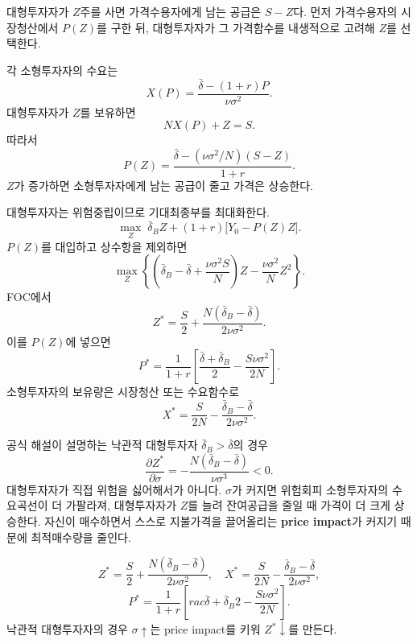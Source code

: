 \begin{strategybox}
대형투자자가 $Z$주를 사면 가격수용자에게 남는 공급은 $S-Z$다. 먼저 가격수용자의 시장청산에서 $P(Z)$를 구한 뒤, 대형투자자가 그 가격함수를 내생적으로 고려해 $Z$를 선택한다.
\end{strategybox}

\begin{solutionbox}
각 소형투자자의 수요는
\[
X(P)=\frac{\bar\delta-(1+r)P}{\nu\sigma^2}.
\]
대형투자자가 $Z$를 보유하면
\[
NX(P)+Z=S.
\]
따라서
\[
\boxed{P(Z)=\frac{\bar\delta-(\nu\sigma^2/N)(S-Z)}{1+r}}.
\]
$Z$가 증가하면 소형투자자에게 남는 공급이 줄고 가격은 상승한다.

대형투자자는 위험중립이므로 기대최종부를 최대화한다.
\[
\max_Z\;\bar\delta_B Z+(1+r)\bigl[Y_0-P(Z)Z\bigr].
\]
$P(Z)$를 대입하고 상수항을 제외하면
\[
\max_Z\left\{
\left(\bar\delta_B-\bar\delta+\frac{\nu\sigma^2S}{N}\right)Z
-\frac{\nu\sigma^2}{N}Z^2
\right\}.
\]
FOC에서
\[
\boxed{Z^*=\frac S2+\frac{N(\bar\delta_B-\bar\delta)}{2\nu\sigma^2}}.
\]
이를 $P(Z)$에 넣으면
\[
\boxed{P^*=\frac1{1+r}\left[
\frac{\bar\delta+\bar\delta_B}{2}-\frac{S\nu\sigma^2}{2N}
\right]}.
\]
소형투자자의 보유량은 시장청산 또는 수요함수로
\[
\boxed{X^*=\frac{S}{2N}-\frac{\bar\delta_B-\bar\delta}{2\nu\sigma^2}}.
\]

공식 해설이 설명하는 낙관적 대형투자자 $\bar\delta_B>\bar\delta$의 경우
\[
\frac{\partial Z^*}{\partial\sigma}
=-\frac{N(\bar\delta_B-\bar\delta)}{\nu\sigma^3}<0.
\]
대형투자자가 직접 위험을 싫어해서가 아니다. $\sigma$가 커지면 위험회피 소형투자자의 수요곡선이 더 가팔라져, 대형투자자가 $Z$를 늘려 잔여공급을 줄일 때 가격이 더 크게 상승한다. 자신이 매수하면서 스스로 지불가격을 끌어올리는 \textbf{price impact}가 커지기 때문에 최적매수량을 줄인다.

\end{solutionbox}

\begin{answerbox}
\[
Z^*=\frac S2+\frac{N(\bar\delta_B-\bar\delta)}{2\nu\sigma^2},
\quad
X^*=\frac{S}{2N}-\frac{\bar\delta_B-\bar\delta}{2\nu\sigma^2},
\]
\[
P^*=\frac1{1+r}\left[rac{\bar\delta+\bar\delta_B}{2}-\frac{S\nu\sigma^2}{2N}\right].
\]
낙관적 대형투자자의 경우 $\sigma\uparrow$는 price impact를 키워 $Z^*\downarrow$를 만든다.
\end{answerbox}

